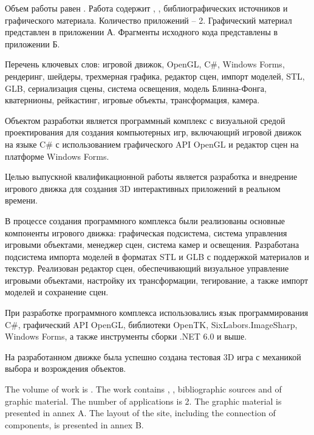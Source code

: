 
Объем работы равен . Работа содержит , ,  библиографических источников и  графического материала. Количество приложений – 2. Графический материал представлен в приложении А. Фрагменты исходного кода представлены в приложении Б.

Перечень ключевых слов: игровой движок, OpenGL, C\#, Windows Forms, рендеринг, шейдеры, трехмерная графика, редактор сцен, импорт моделей, STL, GLB, сериализация сцены, система освещения, модель Блинна-Фонга, кватернионы, рейкастинг, игровые объекты, трансформация, камера.

Объектом разработки является программный комплекс с визуальной средой проектирования для создания компьютерных игр, включающий игровой движок на языке C\# с использованием графического API OpenGL и редактор сцен на платформе Windows Forms.

Целью выпускной квалификационной работы является разработка и внедрение игрового движка для создания 3D интерактивных приложений в реальном времени.

В процессе создания программного комплекса были реализованы основные компоненты игрового движка: графическая подсистема, система управления игровыми объектами, менеджер сцен, система камер и освещения. Разработана подсистема импорта  моделей в форматах STL и GLB с поддержкой материалов и текстур. Реализован редактор сцен, обеспечивающий визуальное управление игровыми объектами, настройку их трансформации, тегирование, а также импорт моделей и сохранение сцен.

При разработке программного комплекса использовались язык программирования C\#, графический API OpenGL, библиотеки OpenTK, SixLabors.ImageSharp, Windows Forms, а также инструменты сборки .NET 6.0 и выше.

На разработанном движке была успешно создана тестовая 3D игра с механикой выбора и возрождения объектов.

  
The volume of work is . The work contains , ,  bibliographic sources and  of graphic material. The number of applications is 2. The graphic material is presented in annex A. The layout of the site, including the connection of components, is presented in annex B.

